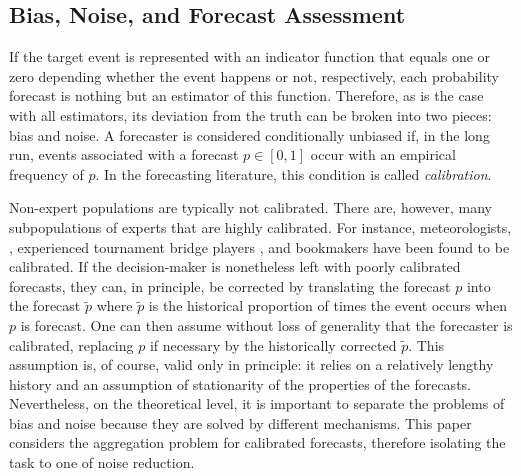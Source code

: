 \documentclass[12pt]{article}
\theoremstyle{definition}
\theoremstyle{definition}
\def\pt{\tilde{p}}
\begin{document}
\subsection{Bias, Noise, and Forecast Assessment}
\label{BiasNoise}
If the target event is represented with an
indicator function that equals one or zero depending whether the event
happens or not, respectively, each probability forecast is nothing but an
estimator of this function. Therefore, as is the case with
all estimators, its deviation from the truth can be broken into two
pieces: bias and noise. A forecaster
is considered conditionally unbiased if, in the long run, events associated
with a forecast $p \in [0,1]$ occur with an empirical frequency of $p$. 
In the forecasting literature, this condition is called \textit{calibration}.


Non-expert populations are typically not calibrated. There are, however,  many subpopulations of experts that are highly
calibrated. For instance, meteorologists,
\citep{murphy1977reliability}, experienced tournament bridge
players 
\citep{keren1987facing}, and bookmakers
\citep{dowie1976efficiency} have been found to be calibrated. If the decision-maker is nonetheless left with poorly
calibrated forecasts, they can, in principle, be corrected by
translating the forecast $p$ into the forecast $\pt$ where $\pt$ is
the historical proportion of times the event occurs when $p$ is
forecast.  One can then assume without loss of generality that the
forecaster is calibrated, replacing $p$ if necessary by the
historically corrected $\pt$. This assumption is, of course, valid
only in principle: it relies on a relatively lengthy history and an
assumption of stationarity of the properties of the forecasts.  
Nevertheless, on the
theoretical level, it is important to separate the problems of bias
and noise because they are solved by different mechanisms.  This
paper considers the aggregation problem for calibrated forecasts,
therefore isolating the task to one of noise reduction.
\end{document}
